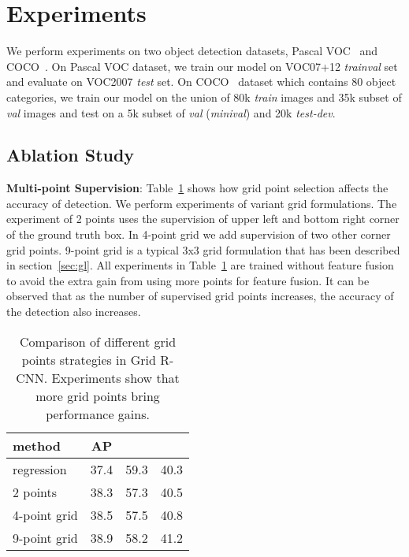 \documentclass[10pt,twocolumn,letterpaper]{article}
\begin{document}
\section{Experiments}
We perform experiments on two object detection datasets, Pascal VOC~\cite{everingham2015pascal} and COCO~\cite{lin2014microsoft}. On Pascal VOC dataset, we train our model on VOC07+12 \textit{trainval} set and evaluate on VOC2007 \textit{test} set. On COCO~\cite{lin2014microsoft} dataset which contains 80 object categories, we train our model on the union of 80k \textit{train} images and 35k subset of \textit{val} images and test on a 5k subset of \textit{val} (\textit{minival}) and 20k \textit{test-dev}.





\subsection{Ablation Study}

\textbf{Multi-point Supervision}: Table~\ref{tab:density} shows how grid point selection affects the accuracy of detection. We perform experiments of variant grid formulations. The experiment of 2 points uses the supervision of upper left and bottom right corner of the ground truth box. In 4-point grid we add supervision of two other corner grid points. 9-point grid is a typical 3x3 grid formulation that has been described in section~\ref{sec:gl}. All experiments in Table~\ref{tab:density} are trained without feature fusion to avoid the extra gain from using more points for feature fusion. It can be observed that as the number of supervised grid points increases, the accuracy of the detection also increases.
\begin{table}[ht]
\begin{center}
\begin{tabular}{ l | c | c  c }
\hline
method & AP &  &  \\
\hline
regression  & 37.4 & 59.3 & 40.3 \\
2 points  & 38.3 & 57.3 & 40.5 \\
4-point grid  & 38.5 & 57.5 & 40.8 \\
9-point grid  & 38.9 & 58.2 & 41.2 \\
\hline
\end{tabular}
\vspace{1mm}
\caption{Comparison of different grid points strategies in Grid R-CNN. Experiments show that more grid points bring performance gains.}
\label{tab:density}
\vspace{-5mm}
\end{center}
\end{table}
\end{document}
